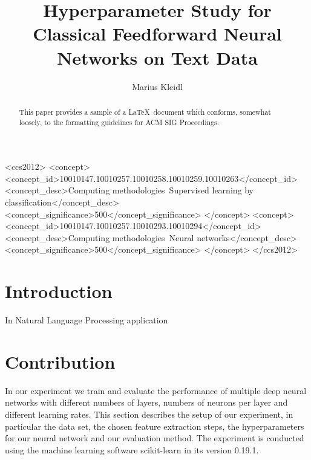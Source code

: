 \documentclass[sigconf]{acmart}
\begin{document}
\title{Hyperparameter Study for Classical Feedforward Neural Networks on Text Data}

\author{Marius Kleidl}


\renewcommand{\shortauthors}{B. Trovato et al.}


\begin{abstract}
This paper provides a sample of a \LaTeX\ document which conforms,
somewhat loosely, to the formatting guidelines for
ACM SIG Proceedings.
\end{abstract}

%
%
 \begin{CCSXML}
	<ccs2012>
	<concept>
	<concept_id>10010147.10010257.10010258.10010259.10010263</concept_id>
	<concept_desc>Computing methodologies~Supervised learning by classification</concept_desc>
	<concept_significance>500</concept_significance>
	</concept>
	<concept>
	<concept_id>10010147.10010257.10010293.10010294</concept_id>
	<concept_desc>Computing methodologies~Neural networks</concept_desc>
	<concept_significance>500</concept_significance>
	</concept>
	</ccs2012>
\end{CCSXML}





\maketitle

\section{Introduction}

In Natural Language Processing application 

\section{Contribution}

In our experiment we train and evaluate the performance of multiple deep neural networks with different numbers of layers, numbers of neurons per layer and different learning rates.
This section describes the setup of our experiment, in particular the data set, the chosen feature extraction steps, the hyperparameters for our neural network and our evaluation method. The experiment is conducted using the machine learning software scikit-learn\cite{scikit-learn} in its version 0.19.1.
\end{document}
